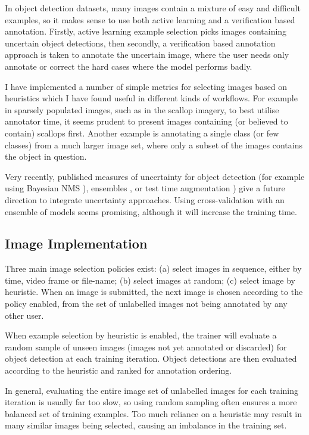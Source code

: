 In object detection datasets, many images contain a mixture of easy and difficult examples, so it makes sense to use both active learning and a verification based annotation.  Firstly, active learning example selection picks images containing uncertain object detections, then secondly, a verification based annotation approach is taken to annotate the uncertain image, where the user needs only annotate or correct the hard cases where the model performs badly.

I have implemented a number of simple metrics for selecting images based on heuristics which I have found useful in different kinds of workflows. For example in sparsely populated images, such as in the scallop imagery, to best utilise annotator time, it seems prudent to present images containing (or believed to 
contain) scallops first. Another example is annotating a single class (or few classes) from a much larger image set, where only a subset of the images contains the object in question.

Very recently, published measures of uncertainty for object detection (for example using Bayesian \gls{NMS} \cite{Harakeh}), ensembles \cite{Le2018}, or test time augmentation \cite{Wei2018}) give a future direction to integrate uncertainty approaches. Using cross-validation with an ensemble of models seems promising, although it will increase the training time.

\subsection {Image Implementation}
\label{sec:example_implementation}

Three main image selection policies exist: (a) select images in sequence, either by time, video frame or file-name; (b) select images at random; (c) select image by heuristic. When an image is submitted, the next image is chosen according to the policy enabled, from the set of unlabelled images not being annotated by any other user.

When example selection by heuristic is enabled, the trainer will evaluate a random sample of unseen images (images not yet annotated or discarded) for object detection at each training iteration. Object detections are then evaluated according to the heuristic and ranked  for annotation ordering. 

In general, evaluating the entire image set of unlabelled images for each training iteration is usually far too slow, so using random sampling often ensures a more balanced set of training examples. Too much reliance  on a heuristic may result in many similar images being selected, causing an imbalance in the training set.

